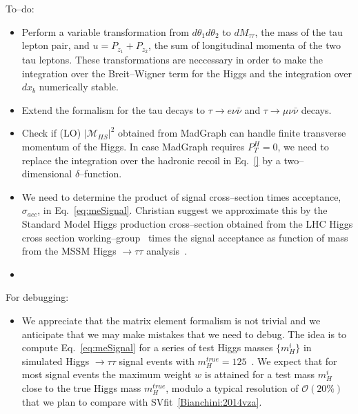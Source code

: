 To--do:
\begin{itemize}
\item Perform a variable transformation from $d\theta_{1} d\theta_{2}$ to $dM_{\tau\tau}$, the mass of the tau lepton pair,
  and $u = P_{z_{1}} + P_{z_{2}}$, the sum of longitudinal momenta of the two tau leptons.
  These transformations are neccessary in order to make the integration over the Breit--Wigner term for the Higgs and the integration over $dx_{b}$ numerically stable.
\item Extend the formalism for the tau decays to $\tau \rightarrow e \nu\bar{\nu}$ and $\tau \rightarrow \mu \nu\bar{\nu}$ decays.
\item Check if (LO) $\vert \mathcal{M}_{HS} \vert^2$ obtained from MadGraph can handle finite transverse momentum of the Higgs.
  In case MadGraph requires $P_{T}^{H} = 0$, we need to replace the integration over the hadronic recoil in Eq.~\ref{} by a two--dimensional $\delta$--function.
\item We need to determine the product of signal cross--section times acceptance, $\sigma_{acc}$, in Eq.~\ref{eq:meSignal}.
  Christian suggest we approximate this by the Standard Model Higgs production cross--section obtained from the LHC Higgs cross section working--group~\cite{}
  times the signal acceptance as function of mass from the MSSM Higgs $\rightarrow \tau\tau$ analysis~\cite{CMS_AN_2013-171}.
\label{eq:meSignal}
\item 
\end{itemize}

For debugging:
\begin{itemize}
\item We appreciate that the matrix element formalism is not trivial and we anticipate that we may make mistakes that we need to debug.
  The idea is to compute Eq.~\ref{eq:meSignal} for a series of test Higgs masses $\{ m_{H}^{i} \}$ in simulated Higgs $\rightarrow \tau\tau$ signal events with $m_{H}^{true} = 125$~\GeV.
  We expect that for most signal events the maximum weight $w$ is attained for a test mass $m_{H}^{i}$ close to the true Higgs mass $m_{H}^{true}$,
  modulo a typical resolution of $\mathcal{O}(20\%)$ that we plan to compare with SVfit~\ref{Bianchini:2014vza}.
\end{itemize}





